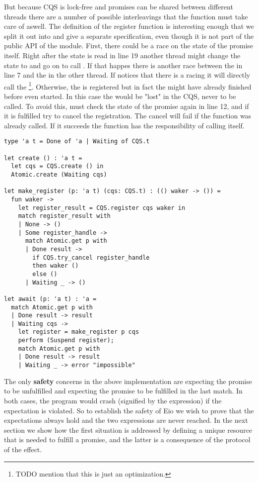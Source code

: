 But because CQS is lock-free and promises can be shared between different threads there are a number of possible interleavings that the  function must take care of aswell.
The definition of the register function is interesting enough that we split it out into  and give a separate specification, even though it is not part of the public API of the module.
First, there could be a race on the state of the promise itself.
Right after the state is read in line 19 another thread might change the state to  and go on to call .
If that happes there is another race between the  in line 7 and the  in the other thread.
If  notices that there is a racing  it will directly call the \footnote{TODO mention that this is just an optimization.}.
Otherwise, the  is registered but in fact the  might have already finished before  even started.
In this case the  would be "lost" in the CQS, never to be called.
To avoid this,  must check the state of the promise again in line 12, and if it is fulfilled try to cancel the  registration.
The cancel will fail if the  function was already called.
If it succeeds the  function has the responsibility of calling  itself.

\begin{verbatim}
type 'a t = Done of 'a | Waiting of CQS.t

let create () : 'a t = 
  let cqs = CQS.create () in
  Atomic.create (Waiting cqs)

let make_register (p: 'a t) (cqs: CQS.t) : (() waker -> ()) = 
  fun waker ->
    let register_result = CQS.register cqs waker in
    match register_result with
    | None -> ()
    | Some register_handle ->
      match Atomic.get p with
      | Done result ->  
        if CQS.try_cancel register_handle
        then waker ()
        else ()
      | Waiting _ -> ()

let await (p: 'a t) : 'a = 
  match Atomic.get p with
  | Done result -> result
  | Waiting cqs ->
    let register = make_register p cqs
    perform (Suspend register);
    match Atomic.get p with
    | Done result -> result 
    | Waiting _ -> error "impossible"
\end{verbatim}

The only \textbf{safety} concerns in the above implementation are  expecting the promise to be unfulfilled and  expecting the promise to be fulfilled in the last match.
In both cases, the program would crash (signified by the  expression) if the expectation is violated.
So to establish the safety of Eio we wish to prove that the expectations always hold and the two  expressions are never reached.
In the next section we show how the first situation is addressed by defining a unique resource that is needed to fulfill a promise, and the latter is a consequence of the protocol of the \esuspend{} effect.

